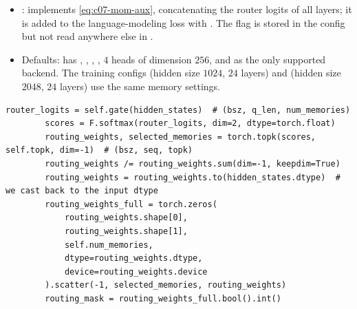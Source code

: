 \begin{implnote}[title={In the code: \texttt{OpenSparseLLMs/MoM}}]
\begin{itemize}
  \cref{eq:c07-mom-update}.
\item {}:  implements
  \cref{eq:c07-mom-aux}, concatenating the router logits of all layers; it is added to the
  language-modeling loss with . The flag 
  is stored in the config but not read anywhere else in .
\item Defaults:  has ,
  , , , $4$ heads of dimension
  $256$, and  as the only supported backend. The training configs
   (hidden size $1024$, $24$ layers) and
   (hidden size $2048$, $24$ layers) use the same
  memory settings.
\end{itemize}
\end{implnote}

\begin{lstlisting}[caption={Excerpt from \texttt{repos/\allowbreak OpenSparseLLMs\_\_MoM/\allowbreak mom/\allowbreak layers/\allowbreak mom.py} (\texttt{MomAttention.forward}): the router.},label={lst:c07-mom-router}]
        router_logits = self.gate(hidden_states)  # (bsz, q_len, num_memories)
        scores = F.softmax(router_logits, dim=2, dtype=torch.float)
        routing_weights, selected_memories = torch.topk(scores, self.topk, dim=-1)  # (bsz, seq, topk)
        routing_weights /= routing_weights.sum(dim=-1, keepdim=True)
        routing_weights = routing_weights.to(hidden_states.dtype)  # we cast back to the input dtype
        routing_weights_full = torch.zeros(
            routing_weights.shape[0],
            routing_weights.shape[1],
            self.num_memories,
            dtype=routing_weights.dtype,
            device=routing_weights.device
        ).scatter(-1, selected_memories, routing_weights)
        routing_mask = routing_weights_full.bool().int()
\end{lstlisting}

